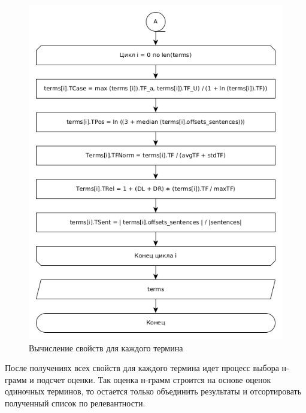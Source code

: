 \begin{figure}[!h]
	\centering
	\includegraphics[width=0.9\linewidth]{src/img/design/calculate_2}
	\caption{Вычисление свойств для каждого термина}
	\label{fig:calculate2}
\end{figure}

После получениях всех свойств для каждого термина идет процесс выбора н-грамм и подсчет оценки.
Так оценка н-грамм строится на основе оценок одиночных терминов, то остается только объединить результаты и отсортировать полученный список по релевантности.


